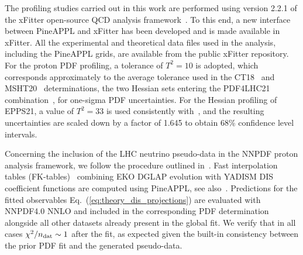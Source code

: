 The profiling studies carried out in this work are performed using version 2.2.1
of the 
{\sc\small xFitter} open-source QCD analysis framework~\cite{Alekhin:2014irh, Bertone:2017tig, xFitter:2022zjb, xFitter:web}.
%
To this end, a new interface between  {\sc\small PineAPPL} and {\sc\small xFitter} has been developed and is made available in {\sc\small xFitter}.
%
All the experimental and theoretical data files used in the analysis, including
the  {\sc\small PineAPPL}  grids, are available
from the public {\sc\small xFitter} repository.
%
For the proton PDF profiling, a tolerance of $T^2 = 10$ is adopted,
which  corresponds approximately to the average tolerance
used in the CT18~\cite{Hou:2019efy} and MSHT20~\cite{Bailey:2020ooq} determinations,
the two Hessian sets entering the PDF4LHC21 combination~\cite{PDF4LHCWorkingGroup:2022cjn}, for
one-sigma PDF uncertainties.
%
For the Hessian profiling of EPPS21, a value of $T^2 = 33$ is used consistently with~\cite{Eskola:2021nhw}, and the resulting uncertainties are scaled down by a factor of 1.645 to obtain 68\% confidence level intervals.

Concerning the inclusion of the LHC neutrino pseudo-data
in the NNPDF proton analysis framework, we follow the procedure
outlined in~\cite{NNPDF:2021uiq}.
%
Fast interpolation tables (FK-tables)~\cite{Ball:2010de} combining {\sc\small EKO}
DGLAP evolution with {\sc\small YADISM} DIS coefficient functions
are computed using {\sc\small PineAPPL}, see also~\cite{Barontini:2023vmr}.
%
Predictions for the fitted observables Eq.~(\ref{eq:theory_dis_projections}) are evaluated
with NNPDF4.0 NNLO and included in the corresponding PDF determination
alongside all other datasets already present in the global fit.
%
We verify that in all cases $\chi^2/n_{\rm dat}\sim 1$ after the fit,
as expected given the built-in consistency between the prior PDF fit
and the generated pseudo-data.




